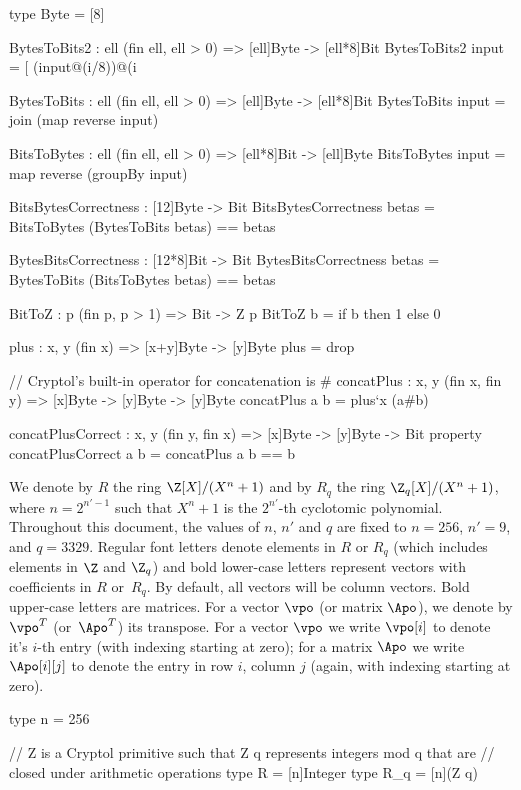 \begin{code}
  type Byte = [8]

  BytesToBits2 : {ell} (fin ell, ell > 0) => [ell]Byte -> [ell*8]Bit
  BytesToBits2 input = [ (input@(i/8))@(i%


  BytesToBits : {ell} (fin ell, ell > 0) => [ell]Byte -> [ell*8]Bit
  BytesToBits input = join (map reverse input)
  
  BitsToBytes : {ell} (fin ell, ell > 0) => [ell*8]Bit -> [ell]Byte
  BitsToBytes input = map reverse (groupBy input)

  BitsBytesCorrectness : [12]Byte -> Bit
  BitsBytesCorrectness betas = BitsToBytes (BytesToBits betas) == betas

  BytesBitsCorrectness : [12*8]Bit -> Bit
  BytesBitsCorrectness betas = BytesToBits (BitsToBytes betas) == betas

  BitToZ : {p} (fin p, p > 1) => Bit -> Z p
  BitToZ b = if b then 1 else 0
  
  plus : {x, y} (fin x) => [x+y]Byte -> [y]Byte
  plus = drop

  // Cryptol's built-in operator for concatenation is #
  concatPlus : {x, y} (fin x, fin y) => [x]Byte -> [y]Byte -> [y]Byte
  concatPlus a b = plus`{x} (a#b)
  
  concatPlusCorrect : {x, y} (fin y, fin x) => [x]Byte -> [y]Byte -> Bit
  property concatPlusCorrect a b = concatPlus a b == b
\end{code}
We denote by $R$ the ring $\Z[X]/(X^{n}+1)$ and by $R_q$ the ring $\Z_q[X]/(X^{n}+1)$, 
where $n=2^{n'-1}$ such that $X^{n}+1$ is the $2^{n'}$-th cyclotomic polynomial. 
Throughout this document, the values of $n$, $n'$ and $q$ are fixed to $n=256$, $n'=9$, and $q=3329$.
Regular font letters denote elements in $R$ or $R_q$ (which includes elements in $\Z$ and $\Z_q$) 
and bold lower-case letters represent vectors with coefficients in $R$ or~$R_q$.  
By default, all vectors will be column vectors. Bold upper-case letters are matrices. 
For a vector $\vpo$ (or matrix $\Apo$), we denote by $\vpo^T$ (or~$\Apo^T$) its transpose.
For a vector $\vpo$ we write $\vpo[i]$ to denote it's $i$-th entry (with indexing starting at zero);
for a matrix $\Apo$ we write $\Apo[i][j]$ to denote the entry in row $i$, column $j$ 
(again, with indexing starting at zero).

\begin{code}
  type n = 256

  // Z is a Cryptol primitive such that Z q represents integers mod q that are 
  // closed under arithmetic operations
  type R = [n]Integer
  type R_q = [n](Z q)
\end{code}


